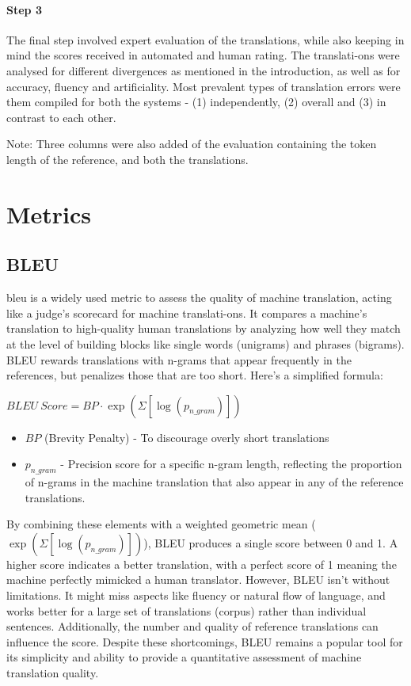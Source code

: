 \paragraph{Step 3} The final step involved expert evaluation of the translations, while also keeping in mind the scores received in automated and human rating. The translati-ons were analysed for different divergences as mentioned in the introduction, as well as for accuracy, fluency and artificiality. Most prevalent types of translation errors were them compiled for both the systems - (1) independently, (2) overall and (3) in contrast to each other.

Note: Three columns were also added of the evaluation containing the token length of the reference, and both the translations.

\section{Metrics}

\subsection{BLEU}

\gls{bleu} is a widely used metric to assess the quality of machine translation, acting like a judge's scorecard for machine translati-ons. It compares a machine's translation to high-quality human translations by analyzing how well they match at the level of building blocks like single words (unigrams) and phrases (bigrams). BLEU rewards translations with n-grams that appear frequently in the references, but penalizes those that are too short. Here's a simplified formula:

$BLEU \ Score = BP \cdot \exp(\Sigma [\log(p_{n\_gram})])$


\begin{itemize}
    \item $BP$ (Brevity Penalty) -  To discourage overly short translations
    \item $p_{n\_gram}$ - Precision score for a specific n-gram length, reflecting the proportion of n-grams in the machine translation that also appear in any of the reference translations.
\end{itemize}

By combining these elements with a weighted geometric mean ($\exp(\Sigma [\log(p_{n\_gram})])$), BLEU produces a single score between 0 and 1. A higher score indicates a better translation, with a perfect score of 1 meaning the machine perfectly mimicked a human translator. However, BLEU isn't without limitations. It might miss aspects like fluency or natural flow of language, and works better for a large set of translations (corpus) rather than individual sentences. Additionally, the number and quality of reference translations can influence the score. Despite these shortcomings, BLEU remains a popular tool for its simplicity and ability to provide a quantitative assessment of machine translation quality.


